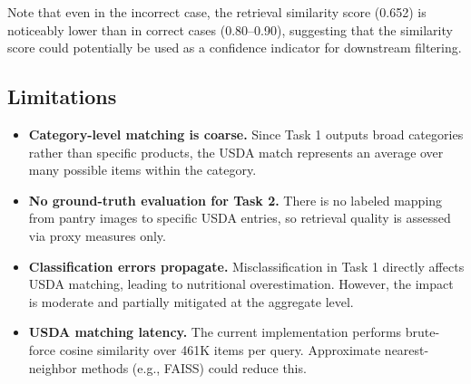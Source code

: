 Note that even in the incorrect case, the retrieval similarity score (0.652) is noticeably lower than in correct cases (0.80--0.90), suggesting that the similarity score could potentially be used as a confidence indicator for downstream filtering.

\subsection{Limitations}

\begin{itemize}[nosep,leftmargin=1.5em]
  \item \textbf{Category-level matching is coarse.} Since Task 1 outputs broad categories rather than specific products, the USDA match represents an average over many possible items within the category.
  \item \textbf{No ground-truth evaluation for Task 2.} There is no labeled mapping from pantry images to specific USDA entries, so retrieval quality is assessed via proxy measures only.
  \item \textbf{Classification errors propagate.} Misclassification in Task 1 directly affects USDA matching, leading to nutritional overestimation. However, the impact is moderate and partially mitigated at the aggregate level.
  \item \textbf{USDA matching latency.} The current implementation performs brute-force cosine similarity over 461K items per query. Approximate nearest-neighbor methods (e.g., FAISS) could reduce this.
\end{itemize}
